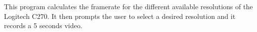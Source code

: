 This program calculates the framerate for the different available resolutions of the Logitech C270. It then prompts the user to select a desired resolution and it records a 5 seconds video. 